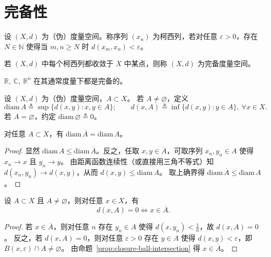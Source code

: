 \documentclass[lang=cn,a4paper,newtx,section]{elegantbook}
\begin{document}
\section{完备性}

\begin{definition}
  设 $(X,d)$ 为（伪）度量空间。称序列 $(x_n)$ 为柯西列，若对任意 $\varepsilon>0$，存在 $N\in\mathbb{N}$ 使得当 $m,n\ge N$ 时 $d(x_m,x_n)<\varepsilon$。
\end{definition}

\begin{definition}
  若 $(X,d)$ 中每个柯西列都收敛于 $X$ 中某点，则称 $(X,d)$ 为完备度量空间。
\end{definition}

\begin{example}
  $\mathbb{R},\ \mathbb{C},\ \mathbb{R}^n$ 在其通常度量下都是完备的。
\end{example}

\begin{definition}
  设 $(X,d)$ 为（伪）度量空间，$A\subset X$。
  若 $A\ne\varnothing$，定义
  \[
    \mathrm{diam}\,A\triangleq \sup\{d(x,y): x,y\in A\};
    \qquad d(x,A)\triangleq \inf\{d(x,y): y\in A\},\ \forall x\in X.
  \]
  若 $A=\varnothing$，约定 $\mathrm{diam}\,\varnothing\triangleq 0$。
\end{definition}

\begin{proposition}
  对任意 $A\subset X$，有 $\mathrm{diam}\,\overline{A}=\mathrm{diam}\,A$。
\end{proposition}

\begin{proof}
  显然 $\mathrm{diam}\,A\le \mathrm{diam}\,\overline{A}$。反之，任取 $x,y\in\overline{A}$，可取序列 $x_n,y_n\in A$ 使得 $x_n\to x$ 且 $y_n\to y$。
  由距离函数连续性（或直接用三角不等式）知 $d(x_n,y_n)\to d(x,y)$，从而 $d(x,y)\le \mathrm{diam}\,A$。
  取上确界得 $\mathrm{diam}\,\overline{A}\le \mathrm{diam}\,A$。
\end{proof}

\begin{proposition}
  设 $A\subset X$ 且 $A\ne\varnothing$，则对任意 $x\in X$，有
  \[
    d(x,A)=0\iff x\in\overline{A}.
  \]
\end{proposition}

\begin{proof}
  若 $x\in\overline{A}$，则对任意 $n$ 存在 $y_n\in A$ 使得 $d(x,y_n)<\frac1n$，故 $d(x,A)=0$。
  反之，若 $d(x,A)=0$，则对任意 $\varepsilon>0$ 存在 $y\in A$ 使得 $d(x,y)<\varepsilon$，即 $B(x,\varepsilon)\cap A\ne\varnothing$。
  由命题~\ref{prop:closure-ball-intersection} 得 $x\in\overline{A}$。
\end{proof}
\end{document}
